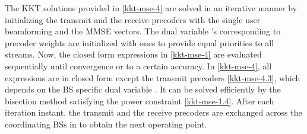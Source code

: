 The \ac{KKT} solutions provided in \eqref{kkt-mse-4} are solved in an iterative manner by initializing the transmit and the receive precoders  with the single user beamforming and the \ac{MMSE} vectors. The dual variable \me{\alpha}'s corresponding to precoder weights are initialized with ones to provide equal priorities to all streams. Now, the closed form expressions in \eqref{kkt-mse-4} are evaluated sequentially until convergence or to a certain accuracy. In \eqref{kkt-mse-4}, all expressions are in closed form except the transmit precoders \eqref{kkt-mse-4.3}, which depends on the \ac{BS} specific dual variable . It can be solved efficiently by the bisection method satisfying the power constraint \eqref{kkt-mse-1.4}. After each iteration instant, the transmit and the receive precoders are exchanged across the coordinating \acp{BS} in  to obtain the next operating point.

